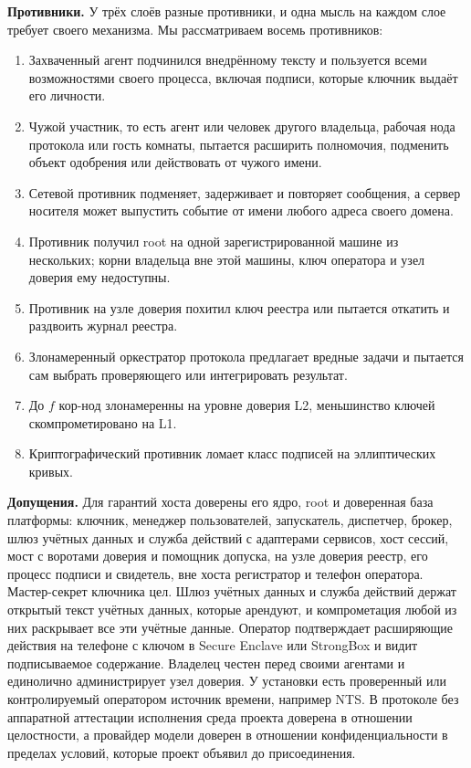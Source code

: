 \documentclass[10pt,a4paper]{article}
\begin{document}
\textbf{Противники.} У трёх слоёв разные противники, и одна мысль на каждом слое требует своего механизма. Мы рассматриваем восемь противников:
\begin{enumerate}[label=П\arabic*.]
\item Захваченный агент подчинился внедрённому тексту и пользуется всеми возможностями своего процесса, включая подписи, которые ключник выдаёт его личности.
\item Чужой участник, то есть агент или человек другого владельца, рабочая нода протокола или гость комнаты, пытается расширить полномочия, подменить объект одобрения или действовать от чужого имени.
\item Сетевой противник подменяет, задерживает и повторяет сообщения, а сервер носителя может выпустить событие от имени любого адреса своего домена.
\item Противник получил root на одной зарегистрированной машине из нескольких; корни владельца вне этой машины, ключ оператора и узел доверия ему недоступны.
\item Противник на узле доверия похитил ключ реестра или пытается откатить и раздвоить журнал реестра.
\item Злонамеренный оркестратор протокола предлагает вредные задачи и пытается сам выбрать проверяющего или интегрировать результат.
\item До $f$ кор-нод злонамеренны на уровне доверия L2, меньшинство ключей скомпрометировано на L1.
\item Криптографический противник ломает класс подписей на эллиптических кривых.
\end{enumerate}

\textbf{Допущения.} Для гарантий хоста доверены его ядро, root и доверенная база платформы: ключник, менеджер пользователей, запускатель, диспетчер, брокер, шлюз учётных данных и служба действий с адаптерами сервисов, хост сессий, мост с воротами доверия и помощник допуска, на узле доверия реестр, его процесс подписи и свидетель, вне хоста регистратор и телефон оператора. Мастер-секрет ключника цел. Шлюз учётных данных и служба действий держат открытый текст учётных данных, которые арендуют, и компрометация любой из них раскрывает все эти учётные данные. Оператор подтверждает расширяющие действия на телефоне с ключом в Secure Enclave или StrongBox и видит подписываемое содержание. Владелец честен перед своими агентами и единолично администрирует узел доверия. У установки есть проверенный или контролируемый оператором источник времени, например NTS. В протоколе без аппаратной аттестации исполнения среда проекта доверена в отношении целостности, а провайдер модели доверен в отношении конфиденциальности в пределах условий, которые проект объявил до присоединения.
\end{document}

